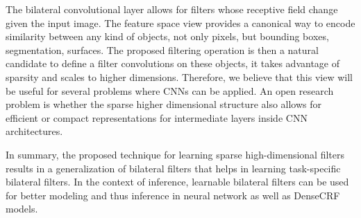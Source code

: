 The bilateral convolutional layer allows for filters whose
receptive field change given the input image. The feature space view provides a
canonical way to encode similarity between any kind of objects, not only pixels, but \eg bounding boxes,
segmentation, surfaces. The proposed filtering operation is then a natural candidate to
define a filter convolutions on these objects, it takes advantage of sparsity and scales to higher dimensions.
Therefore, we believe that this view will be useful for several problems where CNNs
can be applied. An open research problem is whether the sparse higher dimensional
structure also allows for efficient or compact representations for intermediate layers inside
CNN architectures.

In summary, the proposed technique for learning sparse high-dimensional filters
results in a generalization of bilateral filters that helps in learning task-specific
bilateral filters. In the context of inference, learnable bilateral filters can be used for better
modeling and thus inference in neural network as well as DenseCRF models.
